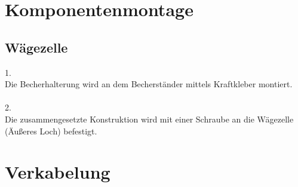 \documentclass[10pt,a4paper]{report}
\begin{document}
	\chapter{Komponentenmontage}
	\section{Wägezelle}
	1.\\
	Die Becherhalterung wird an dem Becherständer mittels Kraftkleber montiert.
	\\ \\
	2.\\ 
	Die zusammengesetzte Konstruktion wird mit einer Schraube an die Wägezelle (Äußeres Loch) befestigt.
	
	
	\chapter{Verkabelung}
	
\end{document}
